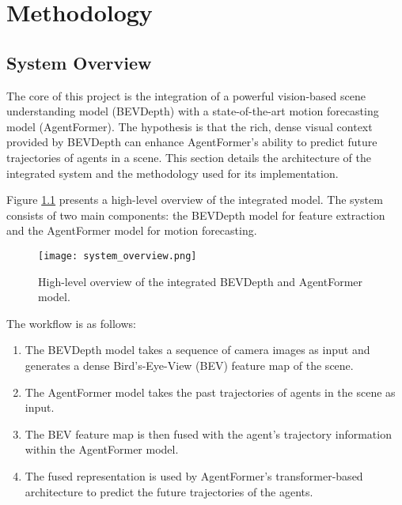 
\chapter{Methodology} %

\label{Chapter3} %


\section{System Overview}

The core of this project is the integration of a powerful vision-based scene understanding model (BEVDepth) with a state-of-the-art motion forecasting model (AgentFormer). The hypothesis is that the rich, dense visual context provided by BEVDepth can enhance AgentFormer's ability to predict future trajectories of agents in a scene. This section details the architecture of the integrated system and the methodology used for its implementation.

Figure \ref{fig:system_overview} presents a high-level overview of the integrated model. The system consists of two main components: the BEVDepth model for feature extraction and the AgentFormer model for motion forecasting.

\begin{figure}[h]
\centering
\texttt{[image: system\_overview.png]}
\caption{High-level overview of the integrated BEVDepth and AgentFormer model.}
\label{fig:system_overview}
\end{figure}

The workflow is as follows:
\begin{enumerate}
    \item The BEVDepth model takes a sequence of camera images as input and generates a dense Bird's-Eye-View (BEV) feature map of the scene.
    \item The AgentFormer model takes the past trajectories of agents in the scene as input.
    \item The BEV feature map is then fused with the agent's trajectory information within the AgentFormer model.
    \item The fused representation is used by AgentFormer's transformer-based architecture to predict the future trajectories of the agents.
\end{enumerate}

